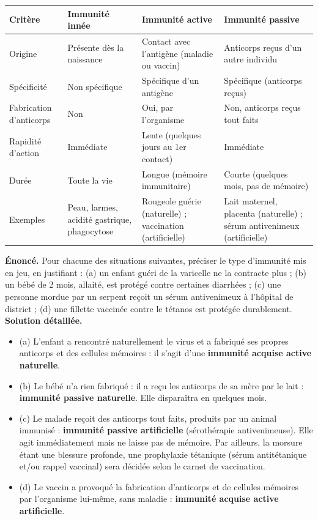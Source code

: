 \documentclass[11pt]{article}
\begin{document}
\begin{center}
\begin{tabularx}{\linewidth}{|l|X|X|X|}
\hline
\rowcolor{popblueL} \textbf{Critère} & \textbf{Immunité innée} & \textbf{Immunité active} & \textbf{Immunité passive} \\
\hline
Origine & Présente dès la naissance & Contact avec l'antigène (maladie ou vaccin) & Anticorps reçus d'un autre individu \\
\hline
Spécificité & Non spécifique & Spécifique d'un antigène & Spécifique (anticorps reçus) \\
\hline
Fabrication d'anticorps & Non & Oui, par l'organisme & Non, anticorps reçus tout faits \\
\hline
Rapidité d'action & Immédiate & Lente (quelques jours au 1er contact) & Immédiate \\
\hline
Durée & Toute la vie & Longue (mémoire immunitaire) & Courte (quelques mois, pas de mémoire) \\
\hline
Exemples & Peau, larmes, acidité gastrique, phagocytose & Rougeole guérie (naturelle) ; vaccination (artificielle) & Lait maternel, placenta (naturelle) ; sérum antivenimeux (artificielle) \\
\hline
\end{tabularx}
\end{center}

\begin{exoresolu}
\textbf{Énoncé.} Pour chacune des situations suivantes, préciser le type d'immunité mis en jeu, en justifiant : (a) un enfant guéri de la varicelle ne la contracte plus ; (b) un bébé de 2 mois, allaité, est protégé contre certaines diarrhées ; (c) une personne mordue par un serpent reçoit un sérum antivenimeux à l'hôpital de district ; (d) une fillette vaccinée contre le tétanos est protégée durablement.
\tcblower
\textbf{Solution détaillée.}
\begin{itemize}
\item (a) L'enfant a rencontré naturellement le virus et a fabriqué ses propres anticorps et des cellules mémoires : il s'agit d'une \textbf{immunité acquise active naturelle}.
\item (b) Le bébé n'a rien fabriqué : il a reçu les anticorps de sa mère par le lait : \textbf{immunité passive naturelle}. Elle disparaîtra en quelques mois.
\item (c) Le malade reçoit des anticorps tout faits, produits par un animal immunisé : \textbf{immunité passive artificielle} (sérothérapie antivenimeuse). Elle agit immédiatement mais ne laisse pas de mémoire. Par ailleurs, la morsure étant une blessure profonde, une prophylaxie tétanique (sérum antitétanique et/ou rappel vaccinal) sera décidée selon le carnet de vaccination.
\item (d) Le vaccin a provoqué la fabrication d'anticorps et de cellules mémoires par l'organisme lui-même, sans maladie : \textbf{immunité acquise active artificielle}.
\end{itemize}
\end{exoresolu}
\end{document}
